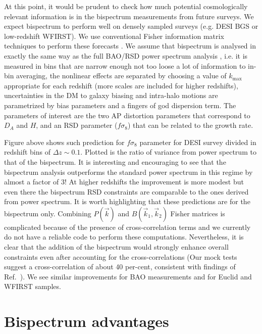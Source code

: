At this point, it would be prudent to check how much potential cosmologically
relevant information is in the bispectrum measurements from future
surveys. We expect bispectrum to perform well on densely sampled surveys (e.g.
DESI BGS or low-redshift WFIRST). We use conventional Fisher information matrix
techniques to perform these forecasts \cite{2009arXiv0906.0664H,2009arXiv0906.4123C}. We assume that bispectrum is analysed in
exactly the same way as the full BAO/RSD power spectrum analysis \cite{2003ApJ...598..720S,2009MNRAS.397.1348W}, i.e. it is
measured in bins that are narrow enough not too loose a lot of information to
in-bin averaging, the nonlinear effects are separated by choosing a value of
$k_\mathrm{max}$ appropriate for each redshift (more scales are included for
higher redshifts), uncertainties in the DM to galaxy biasing and intra-halo
motions are parametrized by bias parameters and a fingers of god dispersion
term. The parameters of interest are the two AP distortion parameters that
correspond to $D_A$ and $H$, and an RSD parameter ($f\sigma_8$) that can be
related to the growth rate.

Figure above shows such prediction for $f\sigma_8$ parameter for DESI
survey divided in redshift bins of $\Delta z \sim 0.1$. Plotted is the ratio of
variance from power spectrum to that of the bispectrum. It is interesting and
encouraging to see that the bispectrum analysis outperforms the standard power
spectrum in this regime by almost a factor of 3! At higher redshifts the
improvement is more modest but even there the bispectrum RSD constraints are
comparable to the ones derived from power spectrum. It is worth highlighting
that these predictions are for the bispectrum only. Combining $P(\vec{k})$ and
$B(\vec{k}_1,\vec{k}_2)$ Fisher matrices is complicated because of the presence
of cross-correlation terms and we currently do not have a reliable code to
perform these computations. Nevertheless, it is clear that the addition of the
bispectrum would strongly enhance overall constraints even after accounting for
the cross-correlations (Our mock tests suggest a cross-correlation of about 40
per-cent, consistent with findings of Ref.~\cite{2017MNRAS.469.1738S}). We see
similar improvements for BAO measurements and for Euclid and WFIRST samples.

\section{Bispectrum advantages}

